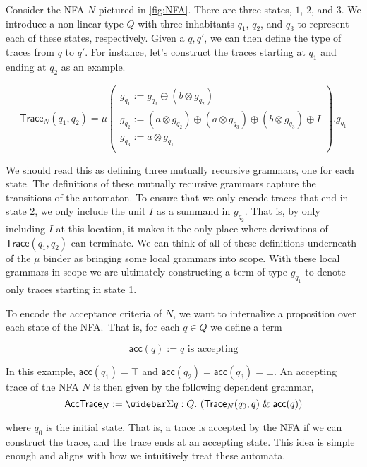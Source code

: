 \documentclass[acmsmall,screen,nonacm]{acmart}
\newcommand{\LinSigTy}[3]{\widebar\Sigma #1 : #2.\, #3}
\newcommand{\amp}{\mathrel{\&}}
\begin{document}
Consider the NFA $N$ pictured in \cref{fig:NFA}. There are three states, $1$, $2$,
and $3$. We introduce a non-linear type $Q$ with three inhabitants $q_{1}$,
$q_{2}$, and $q_{3}$ to represent each of these states, respectively. Given a
$q, q'$, we can
then define the type of traces from $q$ to $q'$. For instance, let's construct
the traces starting at $q_{1}$ and ending at $q_{2}$ as an example.

\begin{equation}
  \label{eq:nfatrace}
  \mathsf{Trace}_{N}(q_{1}, q_{2}) = \mu
  \begin{pmatrix}
    g_{q_{1}} := g_{q_{3}} \oplus ( b \otimes g_{q_{2}} ) \\
    g_{q_{2}} := ( a \otimes g_{q_{2}} ) \oplus ( a \otimes g_{q_{3}} ) \oplus ( b \otimes g_{q_{3}} ) \oplus I \\
    g_{q_{3}} := a \otimes g_{q_{1}} \\
  \end{pmatrix}. g_{q_{1}}
\end{equation}

We should read this as defining three mutually recursive grammars, one for each
state. The definitions of these mutually recursive grammars capture the
transitions of the automaton. To ensure that we only encode traces that end in
state 2, we only include the unit $I$ as a summand in
$g_{q_{2}}$. That is, by only including $I$ at this location, it makes it the
only place where derivations of $\mathsf{Trace}(q_{1}, q_{2})$ can terminate. We
can think of all of these definitions underneath
of the $\mu$ binder as bringing some local grammars into scope. With these local
grammars in scope we are ultimately constructing a term of type $g_{q_{1}}$ to denote
only traces starting in state 1.

To encode the acceptance criteria of $N$, we want to internalize a proposition
over each state of the NFA.\ That is, for each $q \in Q$ we define a term

\[
  \mathsf{acc}(q) := q \text{ is accepting}
\]

In this example, $\mathsf{acc}(q_{1}) = \top$ and
$\mathsf{acc}(q_{2}) = \mathsf{acc}(q_{3}) = \bot$. An accepting trace of the NFA $N$ is then given by the following dependent grammar,
\[
 \mathsf{AccTrace}_{N} := \LinSigTy q Q {\left( \mathsf{Trace}_{N}(q_{0} , q) \amp \mathsf{acc}(q) \right)}
\]

where $q_{0}$ is the initial state. That is, a trace is accepted by the NFA if
we can construct the trace, and the trace ends at an accepting state. This idea
is simple enough and aligns with how we intuitively treat these automata.
\end{document}

